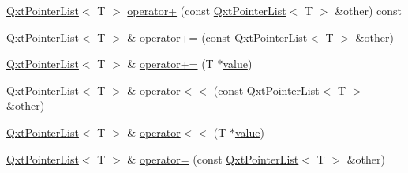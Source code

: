 \begin{DoxyCompactItemize}
\begin{DoxyCompactList}\small\item\em \end{DoxyCompactList}\item 
\hyperlink{class_qxt_pointer_list}{Qxt\-Pointer\-List}$<$ T $>$ \hyperlink{class_qxt_pointer_list_a15e157f61b926658c47952dbf2c6cc9b}{operator+} (const \hyperlink{class_qxt_pointer_list}{Qxt\-Pointer\-List}$<$ T $>$ \&other) const 
\begin{DoxyCompactList}\small\item\em \end{DoxyCompactList}\item 
\hyperlink{class_qxt_pointer_list}{Qxt\-Pointer\-List}$<$ T $>$ \& \hyperlink{class_qxt_pointer_list_a41b0b7a335020a4ec67bafd43f504e9e}{operator+=} (const \hyperlink{class_qxt_pointer_list}{Qxt\-Pointer\-List}$<$ T $>$ \&other)
\begin{DoxyCompactList}\small\item\em \end{DoxyCompactList}\item 
\hyperlink{class_qxt_pointer_list}{Qxt\-Pointer\-List}$<$ T $>$ \& \hyperlink{class_qxt_pointer_list_a8269f34750a5b0b4b3e243a39ea8d0e9}{operator+=} (T $\ast$\hyperlink{glext_8h_aa0e2e9cea7f208d28acda0480144beb0}{value})
\begin{DoxyCompactList}\small\item\em \end{DoxyCompactList}\item 
\hyperlink{class_qxt_pointer_list}{Qxt\-Pointer\-List}$<$ T $>$ \& \hyperlink{class_qxt_pointer_list_a245fd14d3d26fb9d4f091bee60d9fc85}{operator$<$$<$} (const \hyperlink{class_qxt_pointer_list}{Qxt\-Pointer\-List}$<$ T $>$ \&other)
\begin{DoxyCompactList}\small\item\em \end{DoxyCompactList}\item 
\hyperlink{class_qxt_pointer_list}{Qxt\-Pointer\-List}$<$ T $>$ \& \hyperlink{class_qxt_pointer_list_a19f3ff66873baa4d1823acd36eab541e}{operator$<$$<$} (T $\ast$\hyperlink{glext_8h_aa0e2e9cea7f208d28acda0480144beb0}{value})
\begin{DoxyCompactList}\small\item\em \end{DoxyCompactList}\item 
\hyperlink{class_qxt_pointer_list}{Qxt\-Pointer\-List}$<$ T $>$ \& \hyperlink{class_qxt_pointer_list_a2259c18454eb310b871756928534ac8e}{operator=} (const \hyperlink{class_qxt_pointer_list}{Qxt\-Pointer\-List}$<$ T $>$ \&other)
\begin{DoxyCompactList}\small\item\em \end{DoxyCompactList}\end{DoxyCompactItemize}

